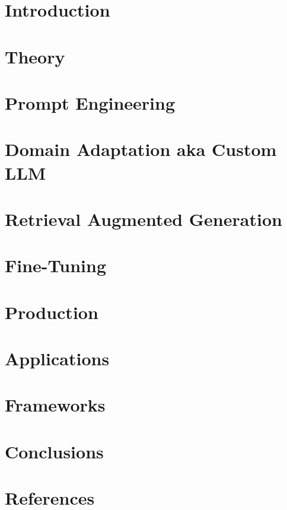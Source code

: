 \section[Intro]{Introduction}


\section[Theory]{Theory}








\section[Prompts]{Prompt Engineering}




\section[DA]{Domain Adaptation aka Custom LLM}



\section[RAG]{Retrieval Augmented Generation}





\section[FT]{Fine-Tuning}


\section[Prod]{Production}





\section[Apps]{Applications}



\section[Frameworks]{Frameworks}








\section[Concl]{Conclusions}


\section[Refs]{References}


